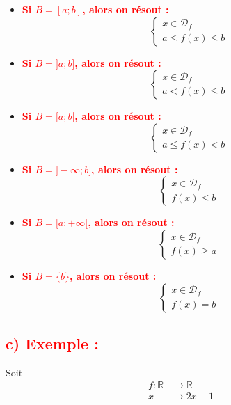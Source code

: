 \documentclass[a4paper,12pt]{article}
\begin{document}
\begin{itemize}
    \item \textbf{\textcolor{red}{Si \( B = [a ; b] \), alors on résout :}}
    \[
    \begin{cases}
        x \in \mathcal{D}_f \\
        a \leq f(x) \leq b
    \end{cases}
    \]

    \item \textbf{\textcolor{red}{Si \( B = ]a ; b] \), alors on résout :}}
    \[
    \begin{cases}
        x \in \mathcal{D}_f \\
        a < f(x) \leq b
    \end{cases}
    \]

    \item \textbf{\textcolor{red}{Si \( B = [a ; b[ \), alors on résout :}}
    \[
    \begin{cases}
        x \in \mathcal{D}_f \\
        a \leq f(x) < b
    \end{cases}
    \]

    \item \textbf{\textcolor{red}{Si \( B = ]-\infty ; b] \), alors on résout :}}
    \[
    \begin{cases}
        x \in \mathcal{D}_f \\
        f(x) \leq b
    \end{cases}
    \]

    \item \textbf{\textcolor{red}{Si \( B = [a ; +\infty[ \), alors on résout :}}
    \[
    \begin{cases}
        x \in \mathcal{D}_f \\
        f(x) \geq a
    \end{cases}
    \]

    \item \textbf{\textcolor{red}{Si \( B = \{ b \} \), alors on résout :}}
    \[
    \begin{cases}
        x \in \mathcal{D}_f \\
        f(x) = b
    \end{cases}
    \]
\end{itemize}

\subsection*{\textcolor{red}{c) Exemple :}}
Soit
    \[
    \begin{aligned}
 f : \mathbb{R} &\to \mathbb{R} \\
        x &\mapsto 2x - 1
    \end{aligned}
    \]
\end{document}
